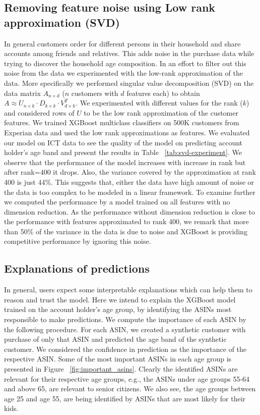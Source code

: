 \subsection{Removing feature noise using Low rank approximation (SVD)}%
In general customers order for different persons in their household and share accounts among friends and relatives. This adds noise in the purchase data while trying to discover the household age composition. In an effort to filter out this noise from the data we experimented with the low-rank approximation of the data. 
%
More specifically we performed singular value decomposition (SVD) on the data matrix $A_{n\times d}$ ($n$ customers with $d$ features each) to obtain $A \approx U_{n\times k}\cdot D_{k \times k} \cdot V_{d \times k}^{T} $. We experimented with different values for the rank ($k$) and considered rows of $U$ to be the low rank approximation of the customer features.  We trained XGBoost multiclass classifiers on 500K customers from Experian data and used the low rank approximations as features. We evaluated our model on ICT data to see the quality of the model on predicting account holder's age band and present the results in Table ~\ref{tab:svd-experiment}. We observe that the performance of the model increases with increase in rank but after rank=$400$ it drops. Also, the variance covered by the approximation at rank 400 is just 44\%. This suggests that, either the data have high amount of noise or the data is too complex to be modeled in a linear framework. To examine further we computed the performance by a model trained on all features with no dimension reduction. As the performance without dimension reduction is close to the performance with features approximated to rank 400, we remark that more than 50\% of the variance in the data is due to noise and XGBoost is providing competitive performance by ignoring this noise.
%
%
\subsection{Explanations of predictions}
In general, users expect some interpretable explanations which can help them to reason and trust the model. 
Here we intend to explain the XGBoost model trained on the account holder's age group, by identifying the ASINs most responsible to make predictions. We compute the importance of each ASIN by the following procedure. For each ASIN, we created a synthetic customer with purchase of only that ASIN and predicted the age band of the synthetic customer. We considered the confidence in prediction as the importance of the respective ASIN. Some of the most important ASINs in each age group is presented in Figure ~\ref{fig:important_asins}. Clearly the identified ASINs are relevant for their respective age groups, e.g., the ASINs under age groups 55-64 and above 65, are relevant to senior citizens. We also see, the age groups between age 25 and age 55, are being identified by ASINs that are most likely for their kids.

